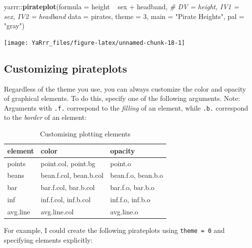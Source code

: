 \documentclass[]{book}
\newenvironment{Shaded}{\begin{snugshade}}{\end{snugshade}}
\newcommand{\KeywordTok}[1]{\textcolor[rgb]{0.13,0.29,0.53}{\textbf{{#1}}}}
\newcommand{\DataTypeTok}[1]{\textcolor[rgb]{0.13,0.29,0.53}{{#1}}}
\newcommand{\DecValTok}[1]{\textcolor[rgb]{0.00,0.00,0.81}{{#1}}}
\newcommand{\StringTok}[1]{\textcolor[rgb]{0.31,0.60,0.02}{{#1}}}
\newcommand{\CommentTok}[1]{\textcolor[rgb]{0.56,0.35,0.01}{\textit{{#1}}}}
\newcommand{\NormalTok}[1]{{#1}}
\theoremstyle{definition}
\theoremstyle{definition}
\theoremstyle{remark}
\begin{document}
\begin{Shaded}
\begin{Highlighting}[]
\NormalTok{yarrr::}\KeywordTok{pirateplot}\NormalTok{(}\DataTypeTok{formula =} \NormalTok{height ~}\StringTok{ }\NormalTok{sex +}\StringTok{ }\NormalTok{headband,    }\CommentTok{# DV = height, IV1 = sex, IV2 = headband}
                  \DataTypeTok{data =} \NormalTok{pirates,           }
                  \DataTypeTok{theme =} \DecValTok{3}\NormalTok{,}
                  \DataTypeTok{main =} \StringTok{"Pirate Heights"}\NormalTok{,}
                  \DataTypeTok{pal =} \StringTok{"gray"}\NormalTok{)}
\end{Highlighting}
\end{Shaded}

\begin{center}\texttt{[image: YaRrr\_files/figure-latex/unnamed-chunk-18-1]} \end{center}

\subsection{Customizing pirateplots}\label{customizing-pirateplots}

Regardless of the theme you use, you can always customize the color and
opacity of graphical elements. To do this, specify one of the following
arguments. Note: Arguments with \texttt{.f.} correspond to the
\emph{filling} of an element, while \texttt{.b.} correspond to the
\emph{border} of an element:

\begin{table}

\caption{\label{tab:unnamed-chunk-19}Customising plotting elements}
\centering
\begin{tabular}[t]{l|l|l}
\hline
element & color & opacity\\
\hline
points & point.col, point.bg & point.o\\
\hline
beans & bean.f.col, bean.b.col & bean.f.o, bean.b.o\\
\hline
bar & bar.f.col, bar.b.col & bar.f.o, bar.b.o\\
\hline
inf & inf.f.col, inf.b.col & inf.f.o, inf.b.o\\
\hline
avg.line & avg.line.col & avg.line.o\\
\hline
\end{tabular}
\end{table}

For example, I could create the following pirateplots using
\texttt{theme\ =\ 0} and specifying elements explicitly:
\end{document}
